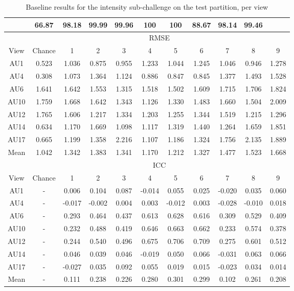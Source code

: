 \documentclass[a4paper, 10pt, conference]{ieeeconf}      \usepackage{FG2017}
\begin{document}
\begin{table*}[t]
\begin{center}
\caption{Baseline results for the intensity sub-challenge on the test partition, per view}
\vspace{2mm}
\label{t:baseline_intensity_per_view_test}
\begin{tabular}{c|c|c|c|c|c|c|c|c|c|c|}
\hhline{-----------}  
\multicolumn{2}{c|}{\% Detected frames} & 66.87 &  98.18 & 99.99 & 99.96 & 100 & 100 & 88.67 & 98.14 & 99.46 \\ \hline
& \multicolumn{10}{c|}{RMSE} \\
\hline
View & Chance & 1 & 2 & 3 & 4 & 5 & 6 & 7 & 8 & 9 \\
\hline
AU1 & 0.523 & 1.036 & 0.875 & 0.955 & 1.233 & 1.044 & 1.245 & 1.046 & 0.946 & 1.278 \\
AU4 & 0.308 & 1.073 & 1.364 & 1.124 & 0.886 & 0.847 & 0.845 & 1.377 & 1.493 & 1.528 \\
AU6 & 1.641 & 1.642 & 1.553 & 1.315 & 1.518 & 1.502 & 1.609 & 1.715 & 1.706 & 1.824 \\
AU10 & 1.759 & 1.668 & 1.642 & 1.343 & 1.126 & 1.330 & 1.483 & 1.660 & 1.504 & 2.009 \\
AU12 & 1.765 & 1.606 & 1.217 & 1.334 & 1.203 & 1.255 & 1.344 & 1.519 & 1.215 & 1.296 \\
AU14 & 0.634 & 1.170 & 1.669 & 1.098 & 1.117 & 1.319 & 1.440 & 1.264 & 1.659 & 1.851 \\
AU17 & 0.665 & 1.199 & 1.358 & 2.216 & 1.107 & 1.186 & 1.324 & 1.756 & 2.135 & 1.889 \\
\hline
Mean & 1.042 & 1.342 & 1.383 & 1.341 &  1.170 & 1.212 & 1.327 & 1.477 & 1.523 & 1.668
 \\ \hline
& \multicolumn{10}{c|}{ICC} \\
\hline
View & Chance & 1 & 2 & 3 & 4 & 5 & 6 & 7 & 8 & 9 \\
\hline
AU1 & - & 0.006 & 0.104 & 0.087 & -0.014 & 0.055 & 0.025 & -0.020 & 0.035 & 0.060 \\ AU4 & - & -0.017 & -0.002 & 0.004 & 0.003 & -0.012 & 0.003 & -0.028 & -0.010 & 0.018 \\ AU6 & - & 0.293 & 0.464 & 0.437 & 0.613 & 0.628 & 0.616 & 0.309 & 0.529 & 0.409 \\ AU10 & - & 0.232 & 0.488 & 0.419 & 0.646 & 0.663 & 0.662 & 0.233 & 0.574 & 0.378 \\ AU12 & - & 0.244 & 0.540 & 0.496 & 0.675 & 0.706 & 0.709 & 0.275 & 0.601 & 0.512 \\ AU14 & - & 0.046 & 0.039 & 0.046 & -0.019 & 0.050 & 0.066 & -0.031 & 0.063 & 0.066 \\ 
AU17 & - & -0.027 & 0.035 & 0.092 & 0.055 & 0.019 & 0.015 & -0.023 & 0.034 & 0.014 \\ 
\hline
Mean & - & 0.111 & 0.238 & 0.226 & 0.280 & 0.301 & 0.299 & 0.102 &0.261 & 0.208  \\
\hline
\end{tabular}
\end{center}
\end{table*}
\end{document}
